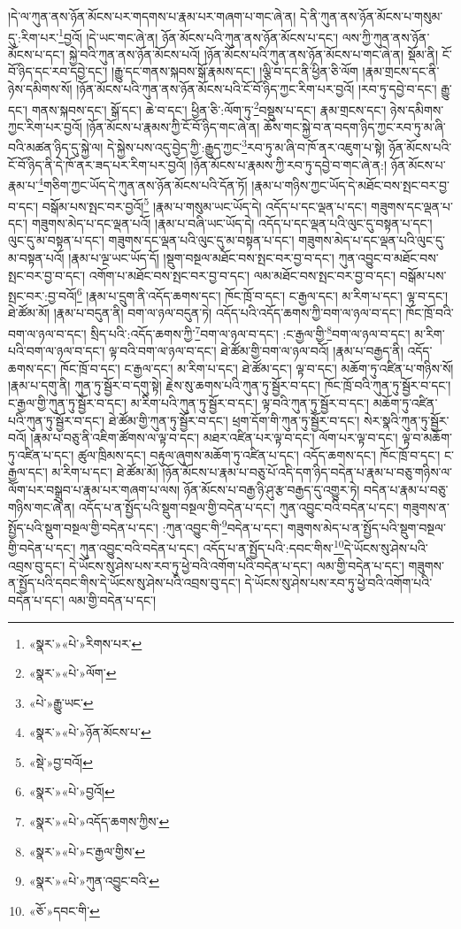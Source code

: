 །དེ་ལ་ཀུན་ནས་ཉོན་མོངས་པར་གདགས་པ་རྣམ་པར་གཞག་པ་གང་ཞེ་ན། དེ་ནི་ཀུན་ནས་ཉོན་མོངས་པ་གསུམ་དུ་:རིག་པར་\footnote{«སྣར་»«པེ་»རིགས་པར་}བྱའོ། །དེ་ཡང་གང་ཞེ་ན། ཉོན་མོངས་པའི་ཀུན་ནས་ཉོན་མོངས་པ་དང་། ལས་ཀྱི་ཀུན་ནས་ཉོན་མོངས་པ་དང་། སྐྱེ་བའི་ཀུན་ནས་ཉོན་མོངས་པའོ། །ཉོན་མོངས་པའི་ཀུན་ནས་ཉོན་མོངས་པ་གང་ཞེ་ན། སྡོམ་ནི། ངོ་བོ་ཉིད་དང་རབ་དབྱེ་དང་། །རྒྱུ་དང་གནས་སྐབས་སྒོ་རྣམས་དང་། །ལྕི་བ་དང་ནི་ཕྱིན་ཅི་ལོག །རྣམ་གྲངས་དང་ནི་ཉེས་དམིགས་སོ། །ཉོན་མོངས་པའི་ཀུན་ནས་ཉོན་མོངས་པའི་ངོ་བོ་ཉིད་ཀྱང་རིག་པར་བྱའོ། །རབ་ཏུ་དབྱེ་བ་དང་། རྒྱུ་དང་། གནས་སྐབས་དང་། སྒོ་དང་། ཆེ་བ་དང་། ཕྱིན་ཅི་:ལོག་ཏུ་\footnote{«སྣར་»«པེ་»ལོག་}བསྡུས་པ་དང་། རྣམ་གྲངས་དང་། ཉེས་དམིགས་ཀྱང་རིག་པར་བྱའོ། །ཉོན་མོངས་པ་རྣམས་ཀྱི་ངོ་བོ་ཉིད་གང་ཞེ་ན། ཆོས་གང་སྐྱེ་བ་ན་བདག་ཉིད་ཀྱང་རབ་ཏུ་མ་ཞི་བའི་མཚན་ཉིད་དུ་སྐྱེ་ལ། དེ་སྐྱེས་པས་འདུ་བྱེད་ཀྱི་:རྒྱུད་ཀྱང་\footnote{«པེ་»རྒྱུ་ཡང་}རབ་ཏུ་མ་ཞི་བ་ཁོ་ནར་འཇུག་པ་སྟེ། ཉོན་མོངས་པའི་ངོ་བོ་ཉིད་ནི་དེ་ཁོ་ནར་ཟད་པར་རིག་པར་བྱའོ། །ཉོན་མོངས་པ་རྣམས་ཀྱི་རབ་ཏུ་དབྱེ་བ་གང་ཞེ་ན:། ཉོན་མོངས་པ་རྣམ་པ་\footnote{«སྣར་»«པེ་»ཉོན་མོངས་པ་}གཅིག་ཀྱང་ཡོད་དེ་ཀུན་ནས་ཉོན་མོངས་པའི་དོན་ཏོ། །རྣམ་པ་གཉིས་ཀྱང་ཡོད་དེ་མཐོང་བས་སྤང་བར་བྱ་བ་དང་། བསྒོམ་པས་སྤང་བར་བྱའོ།\footnote{«སྡེ་»བྱ་བའོ།} །རྣམ་པ་གསུམ་ཡང་ཡོད་དེ། འདོད་པ་དང་ལྡན་པ་དང་། གཟུགས་དང་ལྡན་པ་དང་། གཟུགས་མེད་པ་དང་ལྡན་པའོ། །རྣམ་པ་བཞི་ཡང་ཡོད་དེ། འདོད་པ་དང་ལྡན་པའི་ལུང་དུ་བསྟན་པ་དང་། ལུང་དུ་མ་བསྟན་པ་དང་། གཟུགས་དང་ལྡན་པའི་ལུང་དུ་མ་བསྟན་པ་དང་། གཟུགས་མེད་པ་དང་ལྡན་པའི་ལུང་དུ་མ་བསྟན་པའོ། །རྣམ་པ་ལྔ་ཡང་ཡོད་དོ། །སྡུག་བསྔལ་མཐོང་བས་སྤང་བར་བྱ་བ་དང་། ཀུན་འབྱུང་བ་མཐོང་བས་སྤང་བར་བྱ་བ་དང་། འགོག་པ་མཐོང་བས་སྤང་བར་བྱ་བ་དང་། ལམ་མཐོང་བས་སྤང་བར་བྱ་བ་དང་། བསྒོམ་པས་སྤང་བར་:བྱ་བའོ།\footnote{«སྣར་»«པེ་»བྱའོ།} །རྣམ་པ་དྲུག་ནི་འདོད་ཆགས་དང་། ཁོང་ཁྲོ་བ་དང་། ང་རྒྱལ་དང་། མ་རིག་པ་དང་། ལྟ་བ་དང་། ཐེ་ཚོམ་མོ། །རྣམ་པ་བདུན་ནི། བག་ལ་ཉལ་བདུན་ཏེ། འདོད་པའི་འདོད་ཆགས་ཀྱི་བག་ལ་ཉལ་བ་དང་། ཁོང་ཁྲོ་བའི་བག་ལ་ཉལ་བ་དང་། སྲིད་པའི་:འདོད་ཆགས་ཀྱི་\footnote{«སྣར་»«པེ་»འདོད་ཆགས་ཀྱིས་}བག་ལ་ཉལ་བ་དང་། :ང་རྒྱལ་གྱི་\footnote{«སྣར་»«པེ་»ང་རྒྱལ་གྱིས་}བག་ལ་ཉལ་བ་དང་། མ་རིག་པའི་བག་ལ་ཉལ་བ་དང་། ལྟ་བའི་བག་ལ་ཉལ་བ་དང་། ཐེ་ཚོམ་གྱི་བག་ལ་ཉལ་བའོ། །རྣམ་པ་བརྒྱད་ནི། འདོད་ཆགས་དང་། ཁོང་ཁྲོ་བ་དང་། ང་རྒྱལ་དང་། མ་རིག་པ་དང་། ཐེ་ཚོམ་དང་། ལྟ་བ་དང་། མཆོག་ཏུ་འཛིན་པ་གཉིས་སོ། །རྣམ་པ་དགུ་ནི། ཀུན་ཏུ་སྦྱོར་བ་དགུ་སྟེ། རྗེས་སུ་ཆགས་པའི་ཀུན་ཏུ་སྦྱོར་བ་དང་། ཁོང་ཁྲོ་བའི་ཀུན་ཏུ་སྦྱོར་བ་དང་། ང་རྒྱལ་གྱི་ཀུན་ཏུ་སྦྱོར་བ་དང་། མ་རིག་པའི་ཀུན་ཏུ་སྦྱོར་བ་དང་། ལྟ་བའི་ཀུན་ཏུ་སྦྱོར་བ་དང་། མཆོག་ཏུ་འཛིན་པའི་ཀུན་ཏུ་སྦྱོར་བ་དང་། ཐེ་ཚོམ་གྱི་ཀུན་ཏུ་སྦྱོར་བ་དང་། ཕྲག་དོག་གི་ཀུན་ཏུ་སྦྱོར་བ་དང་། སེར་སྣའི་ཀུན་ཏུ་སྦྱོར་བའོ། །རྣམ་པ་བཅུ་ནི་འཇིག་ཚོགས་ལ་ལྟ་བ་དང་། མཐར་འཛིན་པར་ལྟ་བ་དང་། ལོག་པར་ལྟ་བ་དང་། ལྟ་བ་མཆོག་ཏུ་འཛིན་པ་དང་། ཚུལ་ཁྲིམས་དང་། བརྟུལ་ཞུགས་མཆོག་ཏུ་འཛིན་པ་དང་། འདོད་ཆགས་དང་། ཁོང་ཁྲོ་བ་དང་། ང་རྒྱལ་དང་། མ་རིག་པ་དང་། ཐེ་ཚོམ་མོ། །ཉོན་མོངས་པ་རྣམ་པ་བཅུ་པོ་འདི་དག་ཉིད་བདེན་པ་རྣམ་པ་བཅུ་གཉིས་ལ་ལོག་པར་བསྒྲུབ་པ་རྣམ་པར་གཞག་པ་ལས། ཉོན་མོངས་པ་བརྒྱ་ཉི་ཤུ་རྩ་བརྒྱད་དུ་འགྱུར་ཏེ། བདེན་པ་རྣམ་པ་བཅུ་གཉིས་གང་ཞེ་ན། འདོད་པ་ན་སྤྱོད་པའི་སྡུག་བསྔལ་གྱི་བདེན་པ་དང་། ཀུན་འབྱུང་བའི་བདེན་པ་དང་། གཟུགས་ན་སྤྱོད་པའི་སྡུག་བསྔལ་གྱི་བདེན་པ་དང་། :ཀུན་འབྱུང་གི་\footnote{«སྣར་»«པེ་»ཀུན་འབྱུང་བའི་}བདེན་པ་དང་། གཟུགས་མེད་པ་ན་སྤྱོད་པའི་སྡུག་བསྔལ་གྱི་བདེན་པ་དང་། ཀུན་འབྱུང་བའི་བདེན་པ་དང་། འདོད་པ་ན་སྤྱོད་པའི་:དབང་གིས་\footnote{«ཅོ་»དབང་གི་}དེ་ཡོངས་སུ་ཤེས་པའི་འབྲས་བུ་དང་། དེ་ཡོངས་སུ་ཤེས་པས་རབ་ཏུ་ཕྱེ་བའི་འགོག་པའི་བདེན་པ་དང་། ལམ་གྱི་བདེན་པ་དང་། གཟུགས་ན་སྤྱོད་པའི་དབང་གིས་དེ་ཡོངས་སུ་ཤེས་པའི་འབྲས་བུ་དང་། དེ་ཡོངས་སུ་ཤེས་པས་རབ་ཏུ་ཕྱེ་བའི་འགོག་པའི་བདེན་པ་དང་། ལམ་གྱི་བདེན་པ་དང་། 